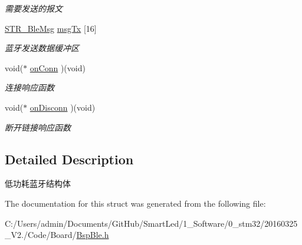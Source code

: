 \begin{DoxyCompactItemize}
\begin{DoxyCompactList}\small\item\em 需要发送的报文 \end{DoxyCompactList}\item 
\hypertarget{struct_s_t_r___ble_a8b59a479137ca60e5d64bbd782c27fe1}{\hyperlink{struct_s_t_r___ble_msg}{\-S\-T\-R\-\_\-\-Ble\-Msg} \hyperlink{struct_s_t_r___ble_a8b59a479137ca60e5d64bbd782c27fe1}{msg\-Tx} \mbox{[}16\mbox{]}}\label{struct_s_t_r___ble_a8b59a479137ca60e5d64bbd782c27fe1}

\begin{DoxyCompactList}\small\item\em 蓝牙发送数据缓冲区 \end{DoxyCompactList}\item 
\hypertarget{struct_s_t_r___ble_aa0366643cc18f4c29366c515f108b68e}{void($\ast$ \hyperlink{struct_s_t_r___ble_aa0366643cc18f4c29366c515f108b68e}{on\-Conn} )(void)}\label{struct_s_t_r___ble_aa0366643cc18f4c29366c515f108b68e}

\begin{DoxyCompactList}\small\item\em 连接响应函数 \end{DoxyCompactList}\item 
\hypertarget{struct_s_t_r___ble_ad3781c9ee9a8b27aa303029e797984f0}{void($\ast$ \hyperlink{struct_s_t_r___ble_ad3781c9ee9a8b27aa303029e797984f0}{on\-Disconn} )(void)}\label{struct_s_t_r___ble_ad3781c9ee9a8b27aa303029e797984f0}

\begin{DoxyCompactList}\small\item\em 断开链接响应函数 \end{DoxyCompactList}\end{DoxyCompactItemize}


\subsection{\-Detailed \-Description}
低功耗蓝牙结构体 

\-The documentation for this struct was generated from the following file\-:\begin{DoxyCompactItemize}
\item 
\-C\-:/\-Users/admin/\-Documents/\-Git\-Hub/\-Smart\-Led/1\-\_\-\-Software/0\-\_\-stm32/20160325\-\_\-\-V2./\-Code/\-Board/\hyperlink{_bsp_ble_8h}{\-Bsp\-Ble.\-h}\end{DoxyCompactItemize}
